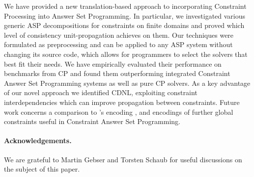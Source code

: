 \documentclass{tlp}
\begin{document}
We have provided a new translation-based approach to incorporating Constraint Processing into Answer Set Programming. In particular, we investigated various generic ASP decompositions for constraints on finite domains and proved which level of consistency unit-pro\-pa\-ga\-tion achieves on them.
Our techniques were formulated as preprocessing and can be applied to any ASP system without changing its source code, which allows for programmers to select the solvers that best fit their needs. We have empirically evaluated their performance on benchmarks from CP and found them outperforming integrated Constraint Answer Set Programming systems as well as pure CP solvers.
As a key advantage of our novel approach we identified CDNL, exploiting constraint interdependencies which can improve propagation between constraints.
Future work concerns a comparison to 's encoding \cite{niemela99a,yoho04a}, and encodings of further global constraints useful in Constraint Answer Set Programming.
\paragraph{Acknowledgements.} We are grateful to Martin Gebser and Torsten Schaub for useful discussions on the subject of this paper.
\end{document}
